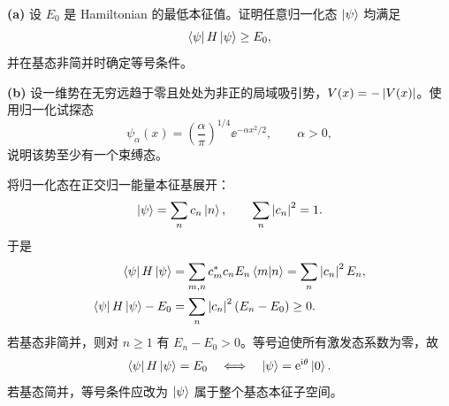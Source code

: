 \textbf{(a)} 设 $E_0$ 是 Hamiltonian 的最低本征值。证明任意归一化态 $\left|\psi\right\rangle$ 均满足
\begin{equation}
  \left\langle \psi\right| H\left|\psi\right\rangle\geq E_0,
  \label{eq:QM-C05-S02-E02-variational-question}
\end{equation}
并在基态非简并时确定等号条件。

\textbf{(b)} 设一维势在无穷远趋于零且处处为非正的局域吸引势，$V(x)=-\left|V(x)\right|$。使用归一化试探态
\begin{equation}
  \psi_\alpha(x)
  =\left(\frac\alpha\pi\right)^{1/4}
  \ee^{-\alpha x^2/2},
  \qquad\alpha>0,
  \label{eq:QM-C05-S02-E02-trial-state}
\end{equation}
说明该势至少有一个束缚态。

\begin{checkedsolution}
将归一化态在正交归一能量本征基展开：
\begin{equation}
  \left|\psi\right\rangle=\sum_n c_n\left|n\right\rangle,
  \qquad
  \sum_n\left|c_n\right|^2=1.
  \label{eq:QM-C05-S02-E02-energy-expansion}
\end{equation}
于是
\begin{align}
  \left\langle \psi\right| H\left|\psi\right\rangle
  &=\sum_{m,n}c_m^*c_nE_n\left\langle m \middle| n \right\rangle
  =\sum_n\left|c_n\right|^2E_n,
  \label{eq:QM-C05-S02-E02-expectation}\\
  \left\langle \psi\right| H\left|\psi\right\rangle-E_0
  &=\sum_n\left|c_n\right|^2(E_n-E_0)\geq0.
  \label{eq:QM-C05-S02-E02-variational-proof}
\end{align}
若基态非简并，则对 $n\geq1$ 有 $E_n-E_0>0$。等号迫使所有激发态系数为零，故
\begin{equation}
  \left\langle \psi\right| H\left|\psi\right\rangle=E_0
  \quad\Longleftrightarrow\quad
  \left|\psi\right\rangle=\mathrm{e}^{\mathrm{i}\theta}\left|0\right\rangle.
  \label{eq:QM-C05-S02-E02-equality-condition}
\end{equation}
若基态简并，等号条件应改为 $\left|\psi\right\rangle$ 属于整个基态本征子空间。


\end{checkedsolution}
